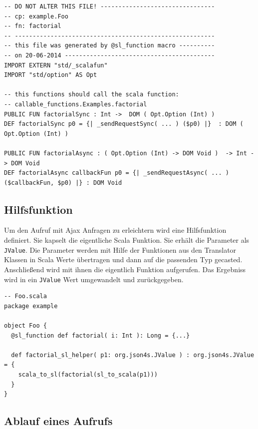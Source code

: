 \documentclass[12pt]{scrreprt}
\begin{document}
\begin{lstlisting}[caption=SL-Modul factorial.sl zur Funktion aus Listing \ref{lst:example-function}, label=lst:example-sl-modul, float=h]
-- DO NOT ALTER THIS FILE! --------------------------------
-- cp: example.Foo
-- fn: factorial
-- --------------------------------------------------------
-- this file was generated by @sl_function macro ----------
-- on 20-06-2014 ------------------------------------------
IMPORT EXTERN "std/_scalafun"
IMPORT "std/option" AS Opt

-- this functions should call the scala function:
-- callable_functions.Examples.factorial
PUBLIC FUN factorialSync : Int ->  DOM ( Opt.Option (Int) )
DEF factorialSync p0 = {| _sendRequestSync( ... ) ($p0) |}  : DOM ( Opt.Option (Int) )

PUBLIC FUN factorialAsync : ( Opt.Option (Int) -> DOM Void )  -> Int -> DOM Void
DEF factorialAsync callbackFun p0 = {| _sendRequestAsync( ... )  ($callbackFun, $p0) |} : DOM Void
\end{lstlisting}

\subsection{Hilfsfunktion}
\label{subsec:helperfunction}

Um den Aufruf mit Ajax Anfragen zu erleichtern wird eine Hilfsfunktion definiert. Sie kapselt die eigentliche Scala Funktion. Sie erhält die Parameter als \lstinline!JValue!. Die Parameter werden mit Hilfe der Funktionen aus den Translator Klassen in Scala Werte übertragen und dann auf die passenden Typ gecasted. Anschließend wird mit ihnen die eigentlich Funktion aufgerufen. Das Ergebniss wird in ein \lstinline!JValue! Wert umgewandelt und zurückgegeben.

\begin{lstlisting}[caption=Hilfsfunktion zur Funktion aus Listing \ref{lst:example-function}, label=lst:helperfunction, float=h]
-- Foo.scala
package example

object Foo {
  @sl_function def factorial( i: Int ): Long = {...}
  
  def factorial_sl_helper( p1: org.json4s.JValue ) : org.json4s.JValue = {
    scala_to_sl(factorial(sl_to_scala(p1)))
  }
}
\end{lstlisting}


\subsection{Ablauf eines Aufrufs}
\label{subs:call-scala-functions}
\end{document}
